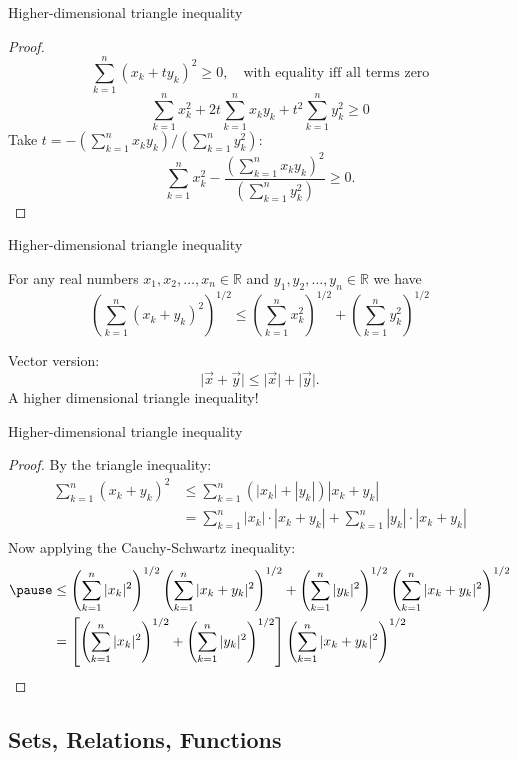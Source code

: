 \documentclass{beamer}
\begin{document}
\begin{frame}{Higher-dimensional triangle inequality}
\begin{proof}
\pause
$$\sum_{k=1}^n (x_k + ty_k)^2\geq 0,\quad \text{with equality iff all terms zero}$$
\pause
$$\sum_{k=1}^n x_k^2 + 2t\sum_{k=1}^n x_ky_k + t^2\sum_{k=1}^ny_k^2\geq 0$$
\pause
Take $t = -\left(\sum_{k=1}^n x_ky_k\right)/\left(\sum_{k=1}^ny_k^2\right):$
\pause
$$\sum_{k=1}^n x_k^2 -\frac{ \left(\sum_{k=1}^n x_ky_k\right)^2}{\left(\sum_{k=1}^ny_k^2\right)}\geq 0.$$
\end{proof}
\end{frame}

\begin{frame}{Higher-dimensional triangle inequality}
\begin{thm}
For any real numbers $x_1,x_2,\dots,x_n\in\mathbb{R}$ and $y_1,y_2,\dots,y_n\in\mathbb{R}$ we have
$$\left(\sum_{k=1}^n (x_k+y_k)^2\right)^{1/2}\leq \left(\sum_{k=1}^n x_k^2\right)^{1/2} + \left(\sum_{k=1}^ny_k^2\right)^{1/2}$$
\end{thm}
\pause
Vector version:
$$\lvert \vec x+\vec y\rvert \leq \lvert \vec x\rvert + \lvert\vec y\rvert.$$
\pause
A higher dimensional triangle inequality!
\end{frame}

\begin{frame}{Higher-dimensional triangle inequality}
\begin{proof}
By the triangle inequality:
\pause
{\tiny
\begin{align*}
\sum_{k=1}^n (x_k+y_k)^2
  & \leq \sum_{k=1}^n (|x_k|+|y_k|)|x_k+y_k|\\
  & =    \sum_{k=1}^n |x_k|\cdot|x_k+y_k| + \sum_{k=1}^n |y_k|\cdot|x_k+y_k|\\
\end{align*}
}
\pause
Now applying the Cauchy-Schwartz inequality: 
\pause
{\tiny
\begin{align*}
\pause
  & \leq \left(\sum_{k=1}^n |x_k|^2\right)^{1/2}\left(\sum_{k=1}^n |x_k+y_k|^2\right)^{1/2}  +  \left(\sum_{k=1}^n |y_k|^2\right)^{1/2}\left(\sum_{k=1}^n |x_k+y_k|^2\right)^{1/2}\\
  & = \left[\left(\sum_{k=1}^n |x_k|^2\right)^{1/2}  +  \left(\sum_{k=1}^n |y_k|^2\right)^{1/2}\right] \left(\sum_{k=1}^n |x_k+y_k|^2\right)^{1/2}
\end{align*}
}
\end{proof}
\end{frame}

\subsection{Sets, Relations, Functions}
\end{document}
